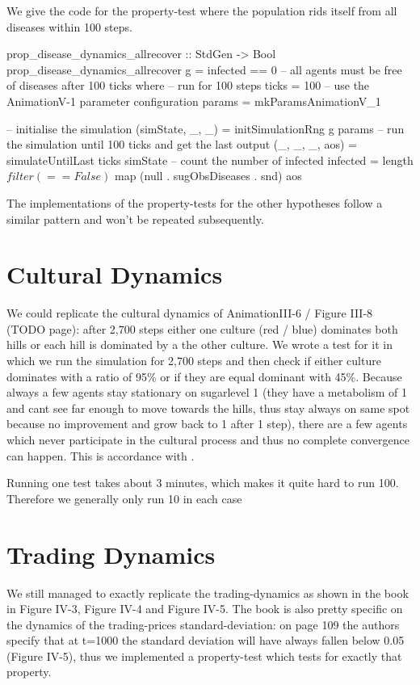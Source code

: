 We give the code for the property-test where the population rids itself from all diseases within 100 steps.

\begin{HaskellCode}
prop_disease_dynamics_allrecover :: StdGen -> Bool
prop_disease_dynamics_allrecover g = infected == 0 -- all agents must be free of diseases after 100 ticks
  where
  	-- run for 100 steps
    ticks  = 100 
    -- use the AnimationV-1 parameter configuration
    params = mkParamsAnimationV_1 

	-- initialise the simulation
    (simState, _, _) = initSimulationRng g params
    -- run the simulation until 100 ticks and get the last output
    (_, _, _, aos) = simulateUntilLast ticks simState  
    -- count the number of infected
    infected = length $ filter (==False) $ map (null . sugObsDiseases . snd) aos
\end{HaskellCode}

The implementations of the property-tests for the other hypotheses follow a similar pattern and won't be repeated subsequently.

\section{Cultural Dynamics}
We could replicate the cultural dynamics of AnimationIII-6 / Figure III-8 (TODO page): after 2,700 steps either one culture (red / blue) dominates both hills or each hill is dominated by a the other culture. We wrote a test for it in which we run the simulation for 2,700 steps and then check if either culture dominates with a ratio of 95\% or if they are equal dominant with 45\%. Because always a few agents stay stationary on sugarlevel 1 (they have a metabolism of 1 and cant see far enough to move towards the hills, thus stay always on same spot because no improvement and grow back to 1 after 1 step), there are a few agents which never participate in the cultural process and thus no complete convergence can happen. This is accordance with \cite{weaver_replicating_2009}.

Running one test takes about 3 minutes, which makes it quite hard to run 100. Therefore we generally only run 10 in each case

\section{Trading Dynamics}

We still managed to exactly replicate the trading-dynamics as shown in the book in Figure IV-3, Figure IV-4 and Figure IV-5. The book is also pretty specific on the dynamics of the trading-prices standard-deviation: on page 109 the authors specify that at t=1000 the standard deviation will have always fallen below 0.05 (Figure IV-5), thus we implemented a property-test which tests for exactly that property.

